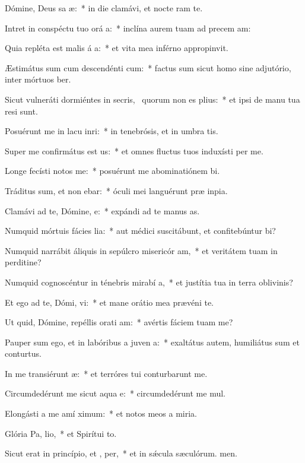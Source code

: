 \item Dómine, Deus sa æ:~* in die clamávi, et nocte ram te.
\item Intret in conspéctu tuo orá a:~* inclína aurem tuam ad precem am:
\item Quia repléta est malis á a:~* et vita mea inférno appropinvit.
\item Æstimátus sum cum descendénti  cum:~* factus sum sicut homo sine adjutório, inter mórtuos ber.
\item Sicut vulneráti dormiéntes in secris,~\pscross{} quorum non es  plius:~* et ipsi de manu tua resi sunt.
\item Posuérunt me in lacu inri:~* in tenebrósis, et in umbra tis.
\item Super me confirmátus est  us:~* et omnes fluctus tuos induxísti per me.
\item Longe fecísti notos   me:~* posuérunt me abominatiónem bi.
\item Tráditus sum, et non ebar:~* óculi mei languérunt præ inpia.
\item Clamávi ad te, Dómine,  e:~* expándi ad te manus as.
\item Numquid mórtuis fácies lia:~* aut médici suscitábunt, et confitebúntur bi?
\item Numquid narrábit áliquis in sepúlcro misericór am,~* et veritátem tuam in perditine?
\item Numquid cognoscéntur in ténebris mirabí a,~* et justítia tua in terra oblivinis?
\item Et ego ad te, Dómi, vi:~* et mane orátio mea prævéni te.
\item Ut quid, Dómine, repéllis orati am:~* avértis fáciem tuam  me?
\item Pauper sum ego, et in labóribus a juven a:~* exaltátus autem, humiliátus sum et conturtus.
\item In me transiérunt  æ:~* et terróres tui conturbarunt me.
\item Circumdedérunt me sicut aqua  e:~* circumdedérunt me mul.
\item Elongásti a me amí  ximum:~* et notos meos a miria.
\item Glória Pa,  lio,~* et Spirítui to.
\item Sicut erat in princípio, et ,  per,~* et in sǽcula sæculórum. men.
